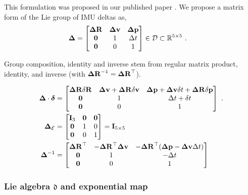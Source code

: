 This formulation was proposed in our published paper \cite{fourmy2019absolute}.
We propose a matrix form of the Lie group of IMU deltas as,
%
\begin{align}\label{equ:delta_Lie}
    {{\bm \Delta}} &= 
    \begin{bmatrix}
    {\bm \Delta {\bf R}} & {\bm \Delta {\bf v}} & {\bm \Delta {\bf p}} \\
    \bf0 & 1 & \Delta t \\
    \bf0 & 0 & 1
    \end{bmatrix} \in \mathcal{D} \subset {\mathbb R}^{5\times 5}
    ~.
\end{align}

Group composition, identity and inverse stem from regular matrix product, identity, and inverse (with ${\bm \Delta {\bf R}}^{-1}={\bm \Delta {\bf R}}^{\top}$).

\begin{align}
    {{\bm \Delta}}\cdot\bm\delta 
    &= 
    \begin{bmatrix}
    {\bm \Delta {\bf R}}{\delta{\bf R}} & {\bm \Delta {\bf v}} + {\bm \Delta {\bf R}}{\delta{\bf v}} & {\bm \Delta {\bf p}}+{\bm \Delta {\bf v}}\delta t + {\bm \Delta {\bf R}}{\delta{\bf p}} \\
    \bf0 & 1 & \Delta t+\delta t \\
    \bf0 & 0 & 1
    \end{bmatrix}
    ~.
    \label{eq:compact_composition}
    \\
    {{\bm \Delta}}_{\mathcal{E}}&=\begin{bmatrix}
    {\bf I}_3 & \bf0 & \bf0 \\
    \bf0 & 1 & 0 \\
    \bf0 & 0 & 1 
    \end{bmatrix} = {\bf I}_{5\times5}
    \label{equ:identity}
    \\
    {{\bm \Delta}}^{-1} &= \begin{bmatrix}
    {\bm \Delta {\bf R}}^{\top} & -{\bm \Delta {\bf R}}^{\top}{\bm \Delta {\bf v}} & -{\bm \Delta {\bf R}}^{\top}({\bm \Delta {\bf p}}-{\bm \Delta {\bf v}}\Delta t) \\
    \bf0 & 1 & -\Delta t \\
    \bf0 & 0 & 1
    \end{bmatrix} 
    \label{equ:inverse}
\end{align}
%



\subsubsection{Lie algebra \texorpdfstring{$\mathfrak{d}$}{d} and exponential map}

